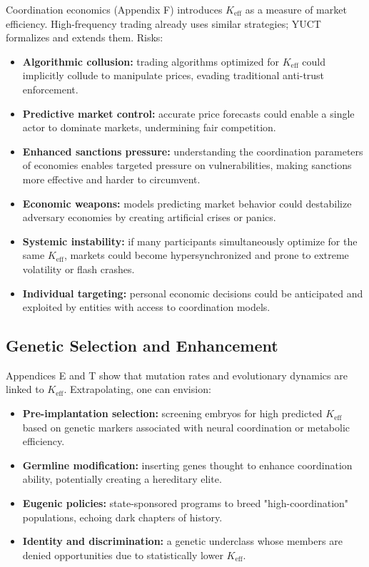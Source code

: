 \documentclass[12pt,a4paper]{article}
\theoremstyle{remark}
\newcommand{\Keff}{K_{\mathrm{eff}}}
\begin{document}
	Coordination economics (Appendix F) introduces \(\Keff\) as a measure of market efficiency. High-frequency trading already uses similar strategies; YUCT formalizes and extends them. Risks:
	\begin{itemize}[leftmargin=*]
		\item \textbf{Algorithmic collusion:} trading algorithms optimized for \(\Keff\) could implicitly collude to manipulate prices, evading traditional anti-trust enforcement.
		\item \textbf{Predictive market control:} accurate price forecasts could enable a single actor to dominate markets, undermining fair competition.
		\item \textbf{Enhanced sanctions pressure:} understanding the coordination parameters of economies enables targeted pressure on vulnerabilities, making sanctions more effective and harder to circumvent.
		\item \textbf{Economic weapons:} models predicting market behavior could destabilize adversary economies by creating artificial crises or panics.
		\item \textbf{Systemic instability:} if many participants simultaneously optimize for the same \(\Keff\), markets could become hypersynchronized and prone to extreme volatility or flash crashes.
		\item \textbf{Individual targeting:} personal economic decisions could be anticipated and exploited by entities with access to coordination models.
	\end{itemize}
	
	\subsection{Genetic Selection and Enhancement}
	\label{subsec:genetic}
	
	Appendices E and T show that mutation rates and evolutionary dynamics are linked to \(\Keff\). Extrapolating, one can envision:
	\begin{itemize}[leftmargin=*]
		\item \textbf{Pre-implantation selection:} screening embryos for high predicted \(\Keff\) based on genetic markers associated with neural coordination or metabolic efficiency.
		\item \textbf{Germline modification:} inserting genes thought to enhance coordination ability, potentially creating a hereditary elite.
		\item \textbf{Eugenic policies:} state-sponsored programs to breed "high-coordination" populations, echoing dark chapters of history.
		\item \textbf{Identity and discrimination:} a genetic underclass whose members are denied opportunities due to statistically lower \(\Keff\).
	\end{itemize}
	
\end{document}

